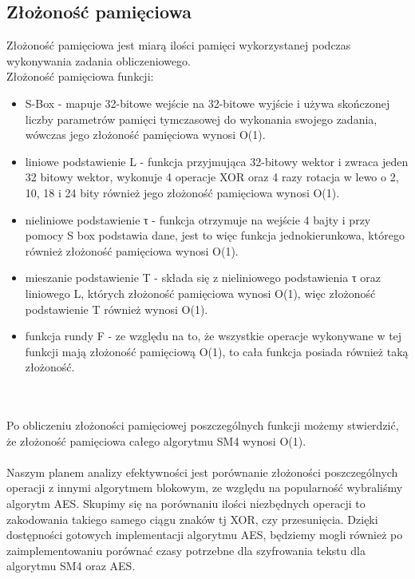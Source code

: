 \subsection{ Złożoność pamięciowa}
Złożoność pamięciowa jest miarą ilości pamięci wykorzystanej podczas wykonywania zadania obliczeniowego.\\

Złożoność pamięciowa funkcji:
\begin{itemize}
    \item S-Box - mapuje 32-bitowe wejście na 32-bitowe wyjście i używa skończonej liczby
parametrów pamięci tymczasowej do wykonania swojego zadania, wówczas jego złożoność pamięciowa wynosi O(1).
    \item liniowe podstawienie L - funkcja przyjmująca 32-bitowy wektor i zwraca jeden 32 bitowy wektor, wykonuje 4 operacje XOR oraz 4 razy rotacja w lewo o 2, 10, 18 i 24 bity również jego złożoność pamięciowa wynosi O(1).
    \item nieliniowe podstawienie τ - funkcja otrzymuje na wejście 4 bajty i przy pomocy S box podstawia dane, jest to więc funkcja jednokierunkowa, którego również złożoność pamięciowa wynosi O(1).
    \item mieszanie podstawienie T  - składa się z nieliniowego podstawienia τ oraz liniowego L, których złożoność pamięciowa wynosi O(1), więc złożoność podstawienie T również wynosi O(1).
    \item funkcja rundy F -  ze względu na to, że wszystkie operacje wykonywane w tej funkcji mają złożoność pamięciową O(1), to cała funkcja posiada również taką złożoność. \\

\end{itemize}\\\\

Po obliczeniu złożoności pamięciowej poszczególnych funkcji możemy stwierdzić, że złożoność pamięciowa całego algorytmu SM4 wynosi O(1).\\\\


Naszym planem analizy efektywności jest porównanie złożoności poszczególnych operacji z innymi algorytmem blokowym, ze względu na popularność wybraliśmy algorytm AES. Skupimy się na porównaniu ilości niezbędnych operacji to zakodowania takiego samego ciągu znaków tj XOR, czy przesunięcia. Dzięki dostępności gotowych implementacji algorytmu AES, będziemy mogli również po zaimplementowaniu porównać czasy potrzebne dla szyfrowania tekstu dla algorytmu SM4 oraz AES.







